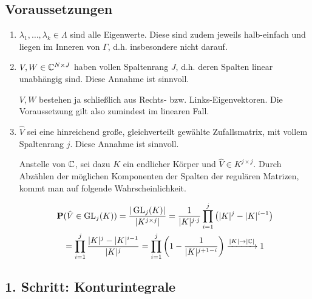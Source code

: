 \subsection*{Voraussetzungen}

\begin{enumerate}[label = \arabic*.]

    \item $\lambda_1, \dots, \lambda_k \in \Lambda$ sind alle Eigenwerte.
    Diese sind zudem jeweils halb-einfach und liegen im Inneren von $\Gamma$, d.h. insbesondere nicht darauf.

    \item $V, W \in \mathbb{C}^{N \times J}$ haben vollen Spaltenrang $J$, d.h. deren Spalten linear unabhängig sind.
    Diese Annahme ist sinnvoll.

    $V, W$ bestehen ja schließlich aus Rechts- bzw. Links-Eigenvektoren.
    Die Voraussetzung gilt also zumindest im linearen Fall.
    
    \item $\hat V$ sei eine hinreichend große, gleichverteilt gewählte Zufallsmatrix, mit vollem Spaltenrang $j$.
    Diese Annahme ist sinnvoll.

    Anstelle von $\mathbb{C}$, sei dazu $K$ ein endlicher Körper und $\hat V \in K^{j \times j}$.
    Durch Abzählen der möglichen Komponenten der Spalten der regulären Matrizen, kommt man auf folgende Wahrscheinlichkeit.

    \begin{multline*}
        \mathbf{P}(\hat V \in \operatorname{GL}_j(K))
        =
        \frac
        {
            |\operatorname{GL}_j(K)|
        }{
            |K^{j \times j}|
        }
        =
        \frac{1}
        {
            |K|^{j \cdot j}
        }
        \prod_{i=1}^j
            {\left ( 
                |K|^j - |K|^{i-1}
             \right )} \\
        =
        \prod_{i=1}^j
            \frac
            {
                |K|^j - |K|^{i-1}
            }{
                |K|^j
            }
        =
        \prod_{i=1}^j
            {\left ( 
                1 - \frac{1}{|K|^{j + 1 - i}}
             \right )}
        \xrightarrow{|K| \to |\mathbb{C}|}
        1
    \end{multline*}

\end{enumerate}

\subsection*{1. Schritt: Konturintegrale}

